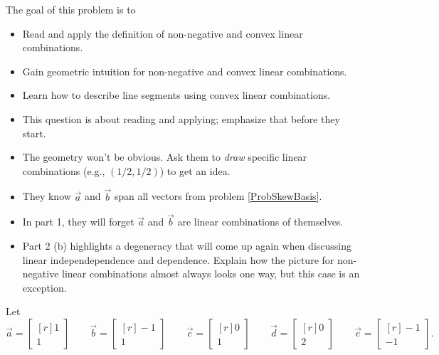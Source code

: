 \documentclass{problemset}
\newcommand{\mat}[1]{\begin{bmatrix*}[r]#1\end{bmatrix*}}
\begin{document}
	\question
	\begin{annotation}
		\begin{goals}
			
			The goal of this problem is to
			\begin{itemize}
				\item Read and apply the definition of non-negative and convex
					linear combinations.
				\item Gain geometric intuition for non-negative and convex linear
					combinations.
				\item Learn how to describe line segments using
					convex linear combinations.
			\end{itemize}
		\end{goals}

		\begin{notes}
			\begin{itemize}
				\item This question is about reading and applying;
					emphasize that before they start.
				\item The geometry won't be obvious. Ask them to \emph{draw} specific
					linear combinations (e.g., $(1/2,1/2)$) to get an idea.
				\item They know $\vec a$ and $\vec b$ span all vectors from problem \ref{ProbSkewBasis}.
				\item In part 1, they will forget $\vec a$ and $\vec b$ are linear combinations of themselves.
				\item Part 2 (b) highlights a degeneracy that will come up again when discussing linear independependence
					and dependence. Explain how the picture for non-negative linear combinations
					almost always looks one way, but this case is an exception.
			\end{itemize}
		\end{notes}
	\end{annotation}
	Let
	\[
		\vec a=\mat{1\\1} \qquad \vec b=\mat{-1\\1}\qquad \vec c=\mat{0\\1}\qquad\vec d=\mat{0\\2}\qquad\vec e=\mat{-1\\-1}.
	\]
\end{document}
